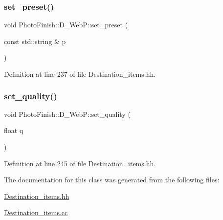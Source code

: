 \subsubsection{\texorpdfstring{set\+\_\+preset()}{set\_preset()}}
{\footnotesize\ttfamily void Photo\+Finish\+::\+D\+\_\+\+Web\+P\+::set\+\_\+preset (\begin{DoxyParamCaption}\item[{const std\+::string \&}]{p }\end{DoxyParamCaption})\hspace{0.3cm}{\ttfamily [inline]}}



Definition at line 237 of file Destination\+\_\+items.\+hh.

\mbox{\label{class_photo_finish_1_1_d___web_p_ac3f3418ca2503b73744d1649445b3771}} 
\subsubsection{\texorpdfstring{set\+\_\+quality()}{set\_quality()}}
{\footnotesize\ttfamily void Photo\+Finish\+::\+D\+\_\+\+Web\+P\+::set\+\_\+quality (\begin{DoxyParamCaption}\item[{float}]{q }\end{DoxyParamCaption})\hspace{0.3cm}{\ttfamily [inline]}}



Definition at line 245 of file Destination\+\_\+items.\+hh.



The documentation for this class was generated from the following files\+:\begin{DoxyCompactItemize}
\item 
\hyperlink{_destination__items_8hh}{Destination\+\_\+items.\+hh}\item 
\hyperlink{_destination__items_8cc}{Destination\+\_\+items.\+cc}\end{DoxyCompactItemize}
